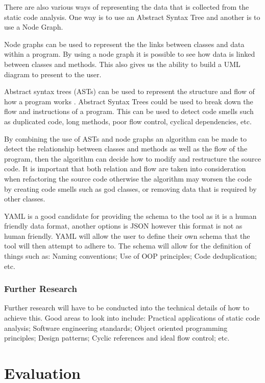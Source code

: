 There are also various ways of representing the data that is collected from the static code analysis. One way is to use an Abstract Syntax Tree \citep{8802820} and another is to use a Node Graph.

Node graphs can be used to represent the the links between classes and data within a program. By using a node graph it is possible to see how data is linked between classes and methods. This also gives us the ability to build a UML diagram to present to the user.

Abstract syntax trees (ASTs) can be used to represent the structure and flow of how a program works \citep{8802820}. Abstract Syntax Trees could be used to break down the flow and instructions of a program. This can be used to detect code smells such as duplicated code, long methods, poor flow control, cyclical dependencies, etc.

By combining the use of ASTs and node graphs an algorithm can be made to detect the relationship between classes and methods as well as the flow of the program, then the algorithm can decide how to modify and restructure the source code. It is important that both relation and flow are taken into consideration when refactoring the source code otherwise the algorithm may worsen the code by creating code smells such as god classes, or removing data that is required by other classes.

YAML is a good candidate for providing the schema to the tool as it is a human friendly data format, another options is JSON however this format is not as human friendly. YAML will allow the user to define their own schema that the tool will then attempt to adhere to. The schema will allow for the definition of things such as: Naming conventions; Use of OOP principles; Code deduplication; etc.

\subsubsection{Further Research}
Further research will have to be conducted into the technical details of how to achieve this. Good areas to look into include: Practical applications of static code analysis; Software engineering standards; Object oriented programming principles; Design patterns; Cyclic references and ideal flow control; etc.

\section{Evaluation}

